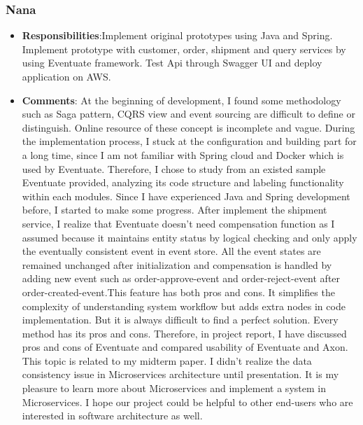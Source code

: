 \subsubsection{Nana}
\begin{itemize}
    \item \textbf{Responsibilities}:Implement original prototypes using Java and Spring. Implement prototype with customer, order, shipment and query services by using Eventuate framework. Test Api through Swagger UI and deploy application on AWS.
    \item \textbf{Comments}: At the beginning of development, I found  some methodology such as Saga pattern, CQRS view and event sourcing are difficult to define or distinguish. Online resource of these concept is incomplete and vague. During the implementation process, I stuck at the configuration and building part for a long time, since I am not familiar with Spring cloud and Docker which is used by Eventuate. Therefore, I chose to study from an existed sample Eventuate provided, analyzing its code structure and labeling functionality within each modules. Since I have experienced Java and Spring development before, I started to make some progress. After implement the shipment service, I realize that Eventuate doesn’t need compensation function as I assumed because it maintains entity status by logical checking and only apply the eventually consistent event in event store. All the event states are remained unchanged after initialization and compensation is handled by adding new event such as order-approve-event and order-reject-event after order-created-event.This feature has both pros and cons. It simplifies the complexity of understanding system workflow but adds extra nodes in code implementation. But it is always difficult to find a perfect solution. Every method has its pros and cons. Therefore, in project report, I have discussed pros and cons of Eventuate and compared usability of Eventuate and Axon. This topic is related to my midterm paper. I didn’t realize the data consistency issue in Microservices architecture until presentation. It is my pleasure to learn more about Microservices and implement a system in Microservices. I hope our project could be helpful to other end-users who are interested in software architecture as well.
\end{itemize}

